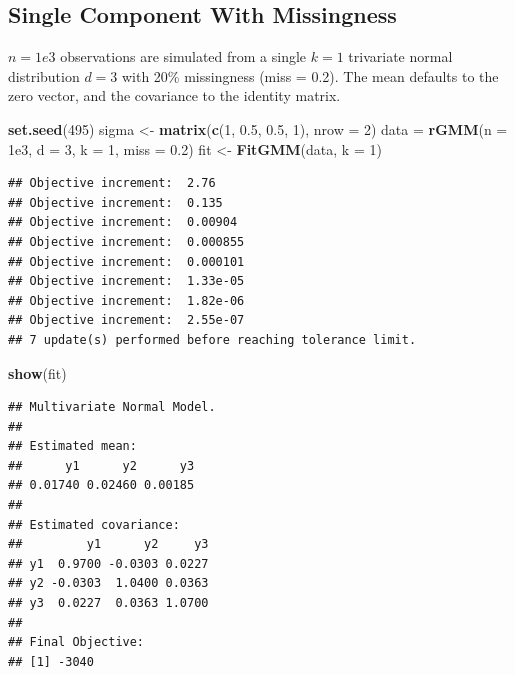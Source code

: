 \documentclass[12pt]{article}
\newenvironment{Shaded}{\begin{snugshade}}{\end{snugshade}}
\newcommand{\AttributeTok}[1]{\textcolor[rgb]{0.13,0.29,0.53}{#1}}
\newcommand{\DecValTok}[1]{\textcolor[rgb]{0.00,0.00,0.81}{#1}}
\newcommand{\FloatTok}[1]{\textcolor[rgb]{0.00,0.00,0.81}{#1}}
\newcommand{\FunctionTok}[1]{\textcolor[rgb]{0.13,0.29,0.53}{\textbf{#1}}}
\newcommand{\NormalTok}[1]{#1}
\newcommand{\OtherTok}[1]{\textcolor[rgb]{0.56,0.35,0.01}{#1}}
\begin{document}
\hypertarget{single-component-with-missingness}{%
\subsection{Single Component With
Missingness}\label{single-component-with-missingness}}

\(n = 1e3\) observations are simulated from a single \(k = 1\)
trivariate normal distribution \(d = 3\) with 20\% missingness (miss =
0.2). The mean defaults to the zero vector, and the covariance to the
identity matrix.

\begin{Shaded}
\begin{Highlighting}[]
\FunctionTok{set.seed}\NormalTok{(}\DecValTok{495}\NormalTok{)}
\NormalTok{sigma }\OtherTok{\textless{}{-}} \FunctionTok{matrix}\NormalTok{(}\FunctionTok{c}\NormalTok{(}\DecValTok{1}\NormalTok{, }\FloatTok{0.5}\NormalTok{, }\FloatTok{0.5}\NormalTok{, }\DecValTok{1}\NormalTok{), }\AttributeTok{nrow =} \DecValTok{2}\NormalTok{)}
\NormalTok{data }\OtherTok{=} \FunctionTok{rGMM}\NormalTok{(}\AttributeTok{n =} \FloatTok{1e3}\NormalTok{, }\AttributeTok{d =} \DecValTok{3}\NormalTok{, }\AttributeTok{k =} \DecValTok{1}\NormalTok{, }\AttributeTok{miss =} \FloatTok{0.2}\NormalTok{)}
\NormalTok{fit }\OtherTok{\textless{}{-}} \FunctionTok{FitGMM}\NormalTok{(data, }\AttributeTok{k =} \DecValTok{1}\NormalTok{)}
\end{Highlighting}
\end{Shaded}

\begin{verbatim}
## Objective increment:  2.76 
## Objective increment:  0.135 
## Objective increment:  0.00904 
## Objective increment:  0.000855 
## Objective increment:  0.000101 
## Objective increment:  1.33e-05 
## Objective increment:  1.82e-06 
## Objective increment:  2.55e-07 
## 7 update(s) performed before reaching tolerance limit.
\end{verbatim}

\begin{Shaded}
\begin{Highlighting}[]
\FunctionTok{show}\NormalTok{(fit)}
\end{Highlighting}
\end{Shaded}

\begin{verbatim}
## Multivariate Normal Model. 
## 
## Estimated mean:
##      y1      y2      y3 
## 0.01740 0.02460 0.00185 
## 
## Estimated covariance:
##         y1      y2     y3
## y1  0.9700 -0.0303 0.0227
## y2 -0.0303  1.0400 0.0363
## y3  0.0227  0.0363 1.0700
## 
## Final Objective:
## [1] -3040
\end{verbatim}
\end{document}
